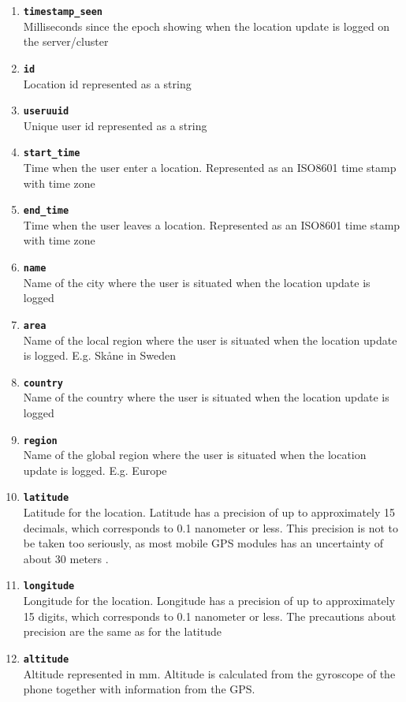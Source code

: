 \begin{enumerate}
\item \texttt{\textbf{timestamp\_seen}}\\Milliseconds since the epoch showing when the location update is logged on the server/cluster 
\item \texttt{\textbf{id}}\\Location id represented as a string  
\item \texttt{\textbf{useruuid}}\\Unique user id represented as a string 
\item \texttt{\textbf{start\_time}}\\Time when the user enter a location. Represented as an ISO8601 time stamp with time zone 
\item \texttt{\textbf{end\_time}}\\Time when the user leaves a location. Represented as an ISO8601 time stamp with time zone
\item \texttt{\textbf{name}}\\Name of the city where the user is situated when the location update is logged 
\item \texttt{\textbf{area}}\\Name of the local region where the user is situated when the location update is logged. E.g. Skåne in Sweden 
\item \texttt{\textbf{country}}\\Name of the country where the user is situated when the location update is logged 
\item \texttt{\textbf{region}}\\Name of the global region where the user is situated when the location update is logged. E.g. Europe
\item \texttt{\textbf{latitude}}\\Latitude for the location. Latitude has a precision of up to approximately 15 decimals, which corresponds to 0.1 nanometer or less. This precision is not to be taken too seriously, as most mobile GPS modules has an uncertainty of about 30 meters   \cite{NAV:8292634}.  
\item \texttt{\textbf{longitude}}\\Longitude for the location. Longitude has a precision of up to approximately 15 digits, which corresponds to 0.1 nanometer or less. The precautions about precision are the same as for the latitude 
\item \texttt{\textbf{altitude}}\\Altitude represented in mm. Altitude is calculated from the gyroscope of the phone together with information from the GPS.  

\end{enumerate}
